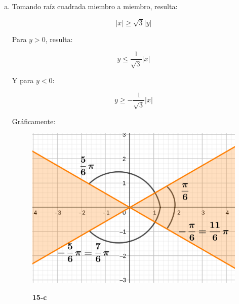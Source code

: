 \documentclass{article}
\begin{document}
\begin{enumerate}[(a)]
En el paso en que se divide por $\rho$ miembro a miembro, se asume $\rho$ distinto de cero. La desigualdad resultante sigue satisfaciéndose para $\rho = 0, \phi = 0$, así que no hay problema.

\begin{equation}
\tcboxmath[colback=orange!25!white,colframe=orange]
{ \left\{ \begin{array}{ll}
\rho \leq 2 \sin(\phi) \\
\frac{\pi}{4} < \phi < \frac{3}{4} \pi
\end{array} \right. }
\end{equation}

\item Tomando raíz cuadrada miembro a miembro, resulta:

\begin{equation}
|x| \geq \sqrt{3} |y|
\end{equation}

Para $y > 0$, resulta:

\begin{equation}
y \leq \frac{1}{\sqrt{3}} |x|
\end{equation}

Y para $y < 0$:

\begin{equation}
y \geq -\frac{1}{\sqrt{3}} |x|
\end{equation}

Gráficamente:

\begin{figure}[ht]
\caption{\textbf{15-c}}
\includegraphics[scale=1]{img/ejercicios/1/15-c.png} 
\centering
\label{fig:1-15-c}
\end{figure}


\end{enumerate}
\end{document}
